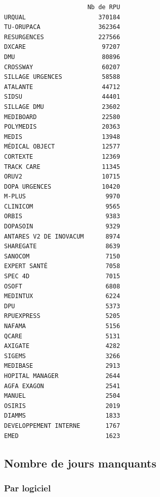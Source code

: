 \documentclass[]{article}
\begin{document}
\begin{verbatim}
                       Nb de RPU
URQUAL                    370184
TU-ORUPACA                362364
RESURGENCES               227566
DXCARE                     97207
DMU                        80896
CROSSWAY                   60207
SILLAGE URGENCES           58588
ATALANTE                   44712
SIDSU                      44401
SILLAGE DMU                23602
MEDIBOARD                  22580
POLYMEDIS                  20363
MEDIS                      13948
MÉDICAL OBJECT             12577
CORTEXTE                   12369
TRACK CARE                 11345
ORUV2                      10715
DOPA URGENCES              10420
M-PLUS                      9970
CLINICOM                    9565
ORBIS                       9383
DOPASOIN                    9329
ANTARES V2 DE INOVACUM      8974
SHAREGATE                   8639
SANOCOM                     7150
EXPERT SANTÉ                7058
SPEC 4D                     7015
OSOFT                       6808
MEDINTUX                    6224
DPU                         5373
RPUEXPRESS                  5205
NAFAMA                      5156
QCARE                       5131
AXIGATE                     4282
SIGEMS                      3266
MEDIBASE                    2913
HOPITAL MANAGER             2644
AGFA EXAGON                 2541
MANUEL                      2504
OSIRIS                      2019
DIAMMS                      1833
DEVELOPPEMENT INTERNE       1767
EMED                        1623
\end{verbatim}

\subsection{Nombre de jours manquants}\label{nombre-de-jours-manquants}

\subsubsection{Par logiciel}\label{par-logiciel}
\end{document}
